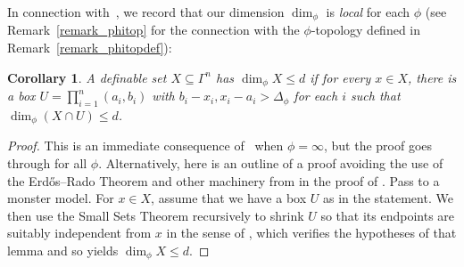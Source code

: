 \documentclass[11pt]{amsart}
\theoremstyle{plain}
\newtheorem{cor}[thm]{Corollary}
\theoremstyle{definition}
\numberwithin{equation}{section}
\newcommand\0{\varnothing}
\begin{document}
\noindent
In connection with~\cite{fornasierohalupczok}, we record that our dimension $\dim_\phi$ is \emph{local} for each $\phi$ (see Remark~\ref{remark_phitop} for the connection with the $\phi$-topology defined in Remark~\ref{remark_phitopdef}):
\begin{cor}\label{cor_localprop}
A definable set $X\subseteq \Gamma^n$ has $\dim_{\phi} X\leq d$ if for every $x \in X$, there is a box $U = \prod_{i=1}^n(a_i,b_i)$ with $b_i-x_i, x_i-a_i>\Delta_\phi$ for each $i$ such that $\dim_\phi(X \cap U) \leq d$.
\end{cor}
\begin{proof}
This is an immediate consequence of~\cite[Theorem~3.1]{fornasierohalupczok} when $\phi = \infty$, but the proof goes through for all $\phi$.
Alternatively, here is an outline of a proof avoiding the use of the Erd\H{o}s--Rado Theorem and other machinery from \cite{fornasiero-dimmatroiddense} in the proof of \cite[Theorem~3.1]{fornasierohalupczok}.
Pass to a monster model.
For $x \in X$, assume that we have a box $U$ as in the statement. We then use the Small Sets Theorem recursively to shrink $U$ so that its endpoints are suitably independent from $x$ in the sense of \cite[Lemma~3.69]{fornasiero-dimmatroiddense}, which verifies the hypotheses of that lemma and so yields $\dim_{\phi} X \leq d$.
\end{proof}
\end{document}
